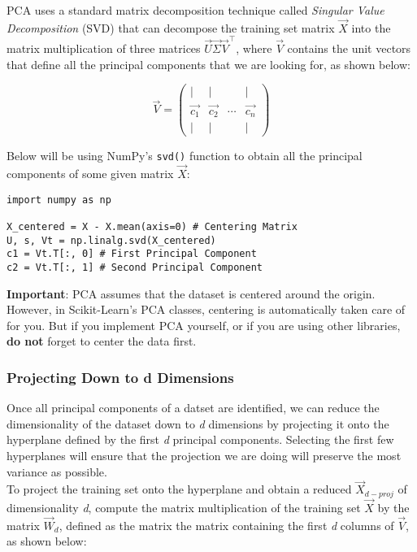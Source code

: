 \noindent
PCA uses a standard matrix decomposition technique called \textit{Singular Value Decomposition} (SVD) that can
decompose the training set matrix $\vec{X}$ into the matrix multiplication of three matrices 
$\vec{U}\vec{\Sigma}\vec{V}^{\intercal}$, where $\vec{V}$ contains the unit vectors that define all the principal
components that we are looking for, as shown below:

$$\vec{V} =
\begin{pmatrix}
| & | &  & | \\
\vec{c_{1}} & \vec{c_{2}} & \cdots & \vec{c_{n}} \\
| & | &  & |
\end{pmatrix}$$

\noindent
Below will be using NumPy's \texttt{svd()} function to obtain all the principal components of some given
matrix $\vec{X}$:

\begin{verbatim}
import numpy as np

X_centered = X - X.mean(axis=0) # Centering Matrix
U, s, Vt = np.linalg.svd(X_centered)
c1 = Vt.T[:, 0] # First Principal Component
c2 = Vt.T[:, 1] # Second Principal Component
\end{verbatim}

\noindent
\textbf{Important}: PCA assumes that the dataset is centered around the origin. However, in Scikit-Learn's PCA classes,
centering is automatically taken care of for you. But if you implement PCA yourself, or if you are using other libraries,
\textbf{do not} forget to center the data first. 

\subsubsection*{Projecting Down to d Dimensions}

Once all principal components of a datset are identified, we can reduce the dimensionality of the dataset down to
\textit{d} dimensions by projecting it onto the hyperplane defined by the first \textit{d} principal components. Selecting
the first few hyperplanes will ensure that the projection we are doing will preserve the most variance as possible. \\

\noindent
To project the training set onto the hyperplane and obtain a reduced $\vec{X}_{d-proj}$ of dimensionality \textit{d},
compute the matrix multiplication of the training set $\vec{X}$ by the matrix $\vec{W}_{d}$, defined as the matrix
the matrix containing the first \textit{d} columns of $\vec{V}$, as shown below:

